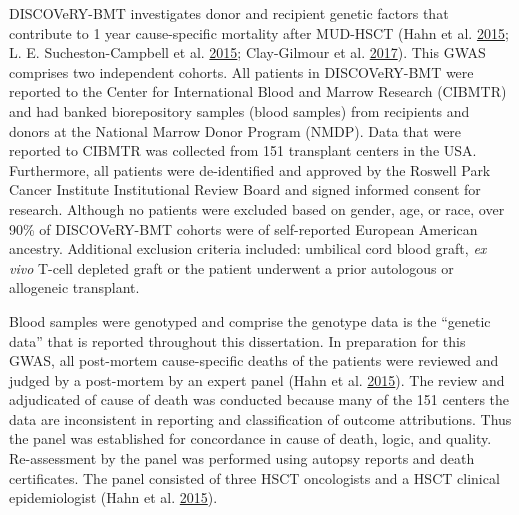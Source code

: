 \documentclass[]{DissertateOSU}
\begin{document}
DISCOVeRY-BMT investigates donor and recipient genetic factors that
contribute to 1 year cause-specific mortality after MUD-HSCT (Hahn et
al. \protect\hyperlink{ref-Hahn_2015}{2015}; L. E. Sucheston-Campbell et
al. \protect\hyperlink{ref-lsc_2015}{2015}; Clay-Gilmour et al.
\protect\hyperlink{ref-Clay_2017}{2017}). This GWAS comprises two
independent cohorts. All patients in DISCOVeRY-BMT were reported to the
Center for International Blood and Marrow Research (CIBMTR) and had
banked biorepository samples (blood samples) from recipients and donors
at the National Marrow Donor Program (NMDP). Data that were reported to
CIBMTR was collected from 151 transplant centers in the USA.
Furthermore, all patients were de-identified and approved by the Roswell
Park Cancer Institute Institutional Review Board and signed informed
consent for research. Although no patients were excluded based on
gender, age, or race, over 90\% of DISCOVeRY-BMT cohorts were of
self-reported European American ancestry. Additional exclusion criteria
included: umbilical cord blood graft, \emph{ex vivo} T-cell depleted
graft or the patient underwent a prior autologous or allogeneic
transplant.

Blood samples were genotyped and comprise the genotype data is the
``genetic data'' that is reported throughout this dissertation. In
preparation for this GWAS, all post-mortem cause-specific deaths of the
patients were reviewed and judged by a post-mortem by an expert panel
(Hahn et al. \protect\hyperlink{ref-Hahn_2015}{2015}). The review and
adjudicated of cause of death was conducted because many of the 151
centers the data are inconsistent in reporting and classification of
outcome attributions. Thus the panel was established for concordance in
cause of death, logic, and quality. Re-assessment by the panel was
performed using autopsy reports and death certificates. The panel
consisted of three HSCT oncologists and a HSCT clinical epidemiologist
(Hahn et al. \protect\hyperlink{ref-Hahn_2015}{2015}).

\end{document}
